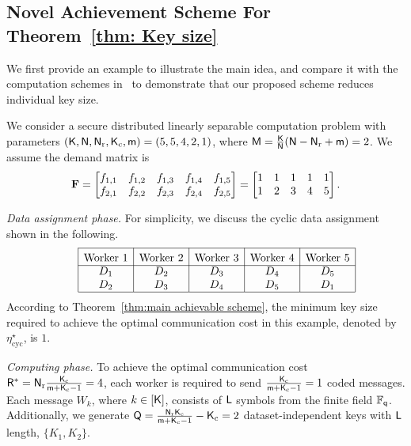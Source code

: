 \documentclass[conference,letterpaper]{IEEEtran}
\begin{document}
\subsection*{Novel Achievement Scheme For Theorem~\ref{thm: Key size}}
\label{sec:sche}
We first provide an example to illustrate the main idea, and compare it with the computation schemes in~\cite{wan2022secure} to demonstrate that our proposed scheme reduces individual key size.
\begin{example}
\label{ex:individual key size example}

We consider a secure distributed linearly separable computation problem with parameters \(({\sf K}, {\sf N}, {\sf N}_{\rm r}, {\sf K}_{\rm c}, {\sf m}) = (5, 5, 4, 2, 1)\), where 
${\sf M} = \frac{{\sf K}}{{\sf N}} ({\sf N} - {\sf N}_{\rm r} + {\sf m}) = 2$. We assume the demand matrix is 
\begin{align}
{\bf F}=
\begin{bmatrix}
f_{1,1}& f_{1,2} &f_{1,3} &f_{1,4} &f_{1,5}  \\
f_{2,1}& f_{2,2} &f_{2,3} &f_{2,4} &f_{2,5} 
\end{bmatrix}
= 
\begin{bmatrix}
1 & 1 & 1 &1 &1 \\
1 & 2 & 3 &4 &5 
\end{bmatrix}
.  
\end{align}

{\it Data assignment phase.}
For simplicity, we discuss the cyclic data assignment shown in the following.
\begin{align*}
\begin{array}{rl|c|c|c|c|c|}\cline{3-3}\cline{4-4}\cline{5-5}\cline{6-6}\cline{7-7}
&&\rule{0pt}{1.2em}\mbox{Worker 1} & \rule{0pt}{1.2em}\mbox{Worker 2} & \rule{0pt}{1.2em}\mbox{Worker 3} & \rule{0pt}{1.2em}\mbox{Worker 4}  & \rule{0pt}{1.2em}\mbox{Worker 5}\\ \cline{3-3}\cline{4-4}\cline{5-5}\cline{6-6}\cline{7-7}
&& D_1 & D_2 & D_3 & D_4 & D_5 \\
&& D_2 & D_3 & D_4 & D_5 & D_1 \\
 \cline{3-3}\cline{4-4}\cline{5-5}\cline{6-6}\cline{7-7}
\end{array} 
\end{align*}
According to Theorem~\ref{thm:main achievable scheme}, the minimum key size required to achieve the optimal communication cost in this example, denoted by $\eta^{\star}_{\text{cyc}}$, is \( 1 \).

{\it Computing phase.}
To achieve the optimal communication cost \( {\sf R}^* = {\sf N}_{\rm r} \frac{{\sf K}_{\rm c}}{{\sf m} + {\sf K}_{\rm c} - 1} = 4 \), each worker is required to send \( \frac{{\sf K}_{\rm c}}{{\sf m} + {\sf K}_{\rm c} - 1} = 1 \) coded messages. Each message \( W_k \), where \( k \in [{\sf K}] \), consists of \({\sf L}\) symbols from the finite field \( \mathbb{F}_{{\sf q}} \).
Additionally, we generate \({\sf Q} = \frac{{\sf N}_{\rm r}{\sf K}_{\rm c}}{{\sf m} + {\sf K}_{\rm c} - 1}-{\sf K}_{\rm c} = 2\) dataset-independent keys with ${\sf L}$ length, $\{K_1,K_2\}$. 


\end{example}
\end{document}
